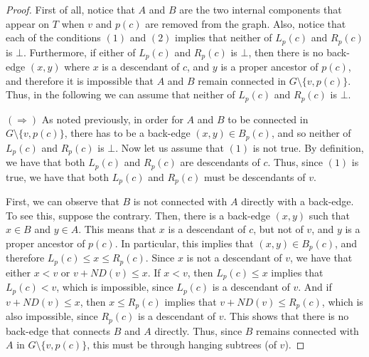 \documentclass[11pt,a4paper]{article}
\begin{document}
\begin{proof}
First of all, notice that $A$ and $B$ are the two internal components that appear on $T$ when $v$ and $p(c)$ are removed from the graph. Also, notice that each of the conditions $(1)$ and $(2)$ implies that neither of $L_p(c)$ and $R_p(c)$ is $\bot$. Furthermore, if either of $L_p(c)$ and $R_p(c)$ is $\bot$, then there is no back-edge $(x,y)$ where $x$ is a descendant of $c$, and $y$ is a proper ancestor of $p(c)$, and therefore it is impossible that $A$ and $B$ remain connected in $G\setminus\{v,p(c)\}$. Thus, in the following we can assume that neither of $L_p(c)$ and $R_p(c)$ is $\bot$.

$(\Rightarrow)$ As noted previously, in order for $A$ and $B$ to be connected in $G\setminus\{v,p(c)\}$, there has to be a back-edge $(x,y)\in B_p(c)$, and so neither of $L_p(c)$ and $R_p(c)$ is $\bot$. Now let us assume that $(1)$ is not true. By definition, we have that both $L_p(c)$ and $R_p(c)$ are descendants of $c$. Thus, since $(1)$ is true, we have that both $L_p(c)$ and $R_p(c)$ must be descendants of $v$. 

First, we can observe that $B$ is not connected with $A$ directly with a back-edge. To see this, suppose the contrary. Then, there is a back-edge $(x,y)$ such that $x\in B$ and $y\in A$. This means that $x$ is a descendant of $c$, but not of $v$, and $y$ is a proper ancestor of $p(c)$. In particular, this implies that $(x,y)\in B_p(c)$, and therefore $L_p(c)\leq x\leq R_p(c)$. Since $x$ is not a descendant of $v$, we have that either $x<v$ or $v+\mathit{ND}(v)\leq x$. If $x<v$, then $L_p(c)\leq x$ implies that $L_p(c)<v$, which is impossible, since $L_p(c)$ is a descendant of $v$. And if $v+\mathit{ND}(v)\leq x$, then $x\leq R_p(c)$ implies that $v+\mathit{ND}(v)\leq R_p(c)$, which is also impossible, since $R_p(c)$ is a descendant of $v$. This shows that there is no back-edge that connects $B$ and $A$ directly. Thus, since $B$ remains connected with $A$ in $G\setminus\{v,p(c)\}$, this must be through hanging subtrees (of $v$).


\end{proof}
\end{document}
